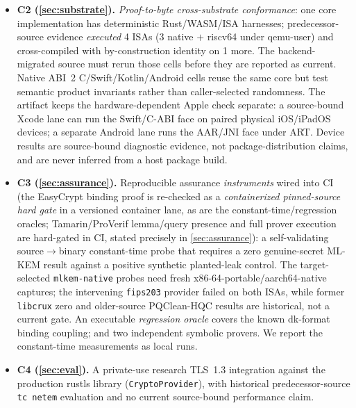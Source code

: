 \documentclass[journal]{IEEEtran}
\newcommand{\code}[1]{\texttt{\small #1}}
\begin{document}
\begin{itemize}
\mbox{K-CT}; a correctly deployed seed-\code{dk} MLKEM768-X25519 construction (whose current CFRG draft specifies a 32-byte \code{dk})
reaches \mbox{MAL-BIND-K-\{CT,PK\}} (\cref{sec:sep}). Native X-Wing has no context parameter, so
K-CTX is not a well-typed comparison; only a hypothetical context wrapper around that shape which
ignores its context fails our local wrapper game.
\item \textbf{C2 (\cref{sec:substrate}).} \emph{Proof-to-byte cross-substrate conformance}: one
core implementation has deterministic Rust/WASM/ISA harnesses; predecessor-source evidence
\emph{executed} 4 ISAs (3 native $+$ riscv64 under qemu-user) and cross-compiled with
by-construction identity on 1 more. The backend-migrated source must rerun those cells before they
are reported as current. Native ABI~2 C/Swift/Kotlin/Android cells reuse the same core
but test semantic product invariants rather than caller-selected randomness. The artifact keeps the hardware-dependent
Apple check separate: a source-bound Xcode lane can run the Swift/C-ABI face on paired physical
iOS/iPadOS devices; a separate Android lane runs the AAR/JNI face under ART. Device results are
source-bound diagnostic evidence, not package-distribution claims, and are never inferred from a
host package build.
\item \textbf{C3 (\cref{sec:assurance}).} Reproducible assurance \emph{instruments} wired into CI
(the EasyCrypt binding proof is re-checked as a \emph{containerized pinned-source hard gate} in a versioned container lane, as
are the constant-time/regression oracles; Tamarin/ProVerif lemma/query presence and full prover
execution are hard-gated in CI, stated precisely in \cref{sec:assurance}): a self-validating source$\to$binary constant-time probe that
requires a zero genuine-secret ML-KEM result against a positive synthetic planted-leak
control. The target-selected \code{mlkem-native} probes need fresh
x86-64-portable/aarch64-native captures;
the intervening \code{fips203} provider failed on both ISAs, while former \code{libcrux}
zero and older-source PQClean-HQC results are historical, not a current gate.
An executable \emph{regression oracle} covers the known dk-format binding
coupling; and two independent symbolic provers. We report the constant-time measurements as
local runs.
\item \textbf{C4 (\cref{sec:eval}).} A private-use research TLS~1.3 integration against the
production rustls library (\code{CryptoProvider}), with historical predecessor-source
\code{tc netem} evaluation and no current source-bound performance claim.

\end{itemize}
\end{document}

